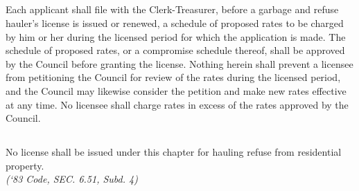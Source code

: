 \subsection{}
Each applicant shall file with the Clerk-Treasurer, before a garbage and refuse hauler’s license is issued or renewed, a schedule of proposed rates to be charged by him or her during the licensed period for which the application is made.  The schedule of proposed rates, or a compromise schedule thereof, shall be approved by the Council before granting the license.  Nothing herein shall prevent a licensee from petitioning the Council for review of the rates during the licensed period, and the Council may likewise consider the petition and make new rates effective at any time.  No licensee shall charge rates in excess of the rates approved by the Council.
\subsection{}
No license shall be issued under this chapter for hauling refuse from residential property.\\
\emph{(‘83 Code, SEC. 6.51, Subd. 4)}
